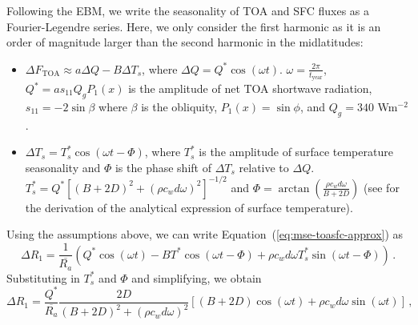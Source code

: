 \documentclass{ametsocV5}
\begin{document}
\appendix[B]
Following the \cite{rose2017} EBM, we write the seasonality of TOA and SFC fluxes as a Fourier-Legendre series. Here, we only consider the first harmonic as it is an order of magnitude larger than the second harmonic in the midlatitudes:
    \begin{itemize}
      \item $\Delta F_{\mathrm{TOA}} \approx a\Delta Q - B\Delta T_{s}$, where $\Delta Q = Q^{*}\cos(\omega t)$. $\omega=\frac{2\pi}{t_{\mathrm{year}}}$, $Q^{*}=as_{11}Q_{g}P_{1}(x)$ is the amplitude of net TOA shortwave radiation, $s_{11}=-2\sin{\beta}$ where $\beta$ is the obliquity, $P_1(x) = \sin\phi$, and $Q_{g}=340$ Wm$^{-2}$. 
      \item $\Delta T_{s} = T_{s}^{*}\cos(\omega t - \Phi)$, where $T_{s}^{*}$ is the amplitude of surface temperature seasonality and $\Phi$ is the phase shift of $\Delta T_{s}$ relative to $\Delta Q$. $T_{s}^{*}=Q^{*}\left[(B+2D)^{2}+(\rho c_w d \omega)^{2}\right]^{-1/2}$ and $\Phi=\arctan\left(\frac{\rho c_w d \omega}{B+2D}\right)$ (see \cite{rose2017} for the derivation of the analytical expression of surface temperature).
    \end{itemize}
  Using the assumptions above, we can write Equation~(\ref{eq:mse-toasfc-approx}) as
  \begin{equation} \label{eq:r1-linear3}
    \Delta R_{1} = \frac{1}{\overline{R_{a}}}\left(Q^{*}\cos(\omega t) -BT^{*}\cos(\omega t - \Phi)+\rho c_{w} d \omega T_{s}^{*}\sin(\omega t - \Phi) \right) \, .
  \end{equation}
  Substituting in $T_{s}^{*}$ and $\Phi$ and simplifying, we obtain
  \begin{equation} \label{eq:r1-linear4-deriv}
    \Delta R_{1} = \frac{Q^{*}}{\overline{R_{a}}}\frac{2D}{(B+2D)^{2}+(\rho c_w d \omega)^{2}}\left[(B+2D)\cos(\omega t)+\rho c_w d \omega \sin(\omega t)\right] \, ,
  \end{equation}
\end{document}
